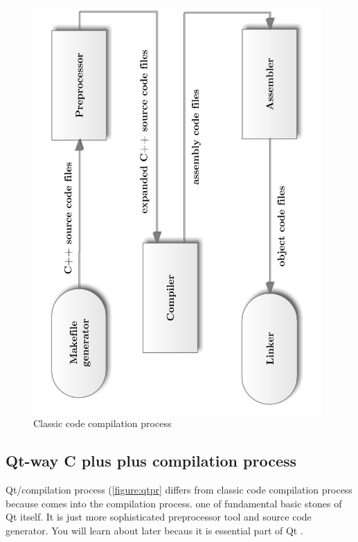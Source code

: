 \begin{figure}[ht]
\centering
\includegraphics[angle=-90,width=11cm]{graphics/laboratory/09-classiccomp.pdf}
\caption{Classic \cpp code compilation process}\label{figure:classicpr}
\end{figure}

\subsection{Qt-way C plus plus compilation process}
Qt/\cpp compilation process (\autoref{figure:qtpr} differs from classic \cpp code compilation process because  comes into the compilation process.  one of fundamental basic stones of Qt itself. It is just more sophisticated preprocessor tool and source code generator. You will learn about  later becaus it is essential part of Qt .

